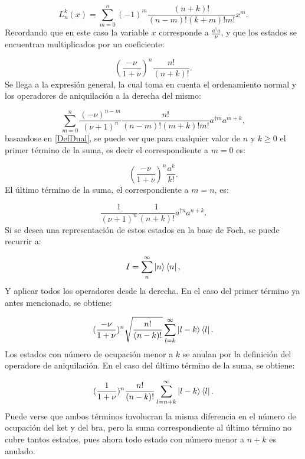 \documentclass[a4paper,10pt]{report}
\begin{document}
\begin{equation}\label{DefLaguerre}
L_n^k(x) = \sum_{m=0}^n (-1)^m \frac{(n+k)!}{(n-m)!(k+m)!m!} x^m.
\end{equation} Recordando que en este caso la variable $x$ corresponde a $\frac{a^\dagger a}{\nu}$, y que los estados se encuentran multiplicados por un coeficiente:

\begin{equation}
(\frac{-\nu}{1+\nu})^n \frac{n!}{(n+k)!}.
\end{equation}Se llega a la expresión general, la cual toma en cuenta el ordenamiento normal y los operadores de aniquilación a la derecha del mismo:

\begin{equation}\label{DefDual}
\sum_{m=0}^n \frac{(-\nu)^{n-m}}{(\nu+1)^n} \frac{n!}{(n-m)!(m+k)!m!} a^{\dagger m}a^{m+k},
\end{equation}basandose en \ref{DefDual}, se puede ver que para cualquier valor de $n$ y $k \geq 0$ el primer término de la suma, es decir el correspondiente a $m=0$ es:

\begin{equation}
(\frac{-\nu}{1+\nu})^n \frac{a^k}{k!}.
\end{equation} El último término de la suma, el correspondiente a $m=n$, es:

\begin{equation}
\frac{1}{(\nu+1)^n} \frac{1}{(n+k)!} a^{\dagger n}a^{n+k}.
\end{equation}Si se desea una representación de estos estados en la base de Foch, se puede recurrir a:

\begin{equation}
I = \sum^\infty _n \Ket{n}\Bra{n},
\end{equation}Y aplicar todos los operadores desde la derecha. En el caso del primer término ya antes mencionado, se obtiene:

\begin{equation}
 (\frac{-\nu}{1+\nu})^n \sqrt{\frac{n!}{(n-k)!}}\sum^\infty _{l=k} \Ket{l-k}\Bra{l}.
\end{equation} Los estados con número de ocupación menor a $k$ se anulan por la definición del operadore de aniquilación. En el caso del último término de la suma, se obtiene:

\begin{equation}
(\frac{1}{1+\nu})^n \frac{n!}{(n-k)!}\sum^\infty _{l=n+k} \Ket{l-k}\Bra{l}.
\end{equation} Puede verse que ambos términos involucran la misma diferencia en el número de ocupación del ket y del bra, pero la suma correspondiente al último término no cubre tantos estados, pues ahora todo estado con número menor a $n+k$ es anulado.
\end{document}
